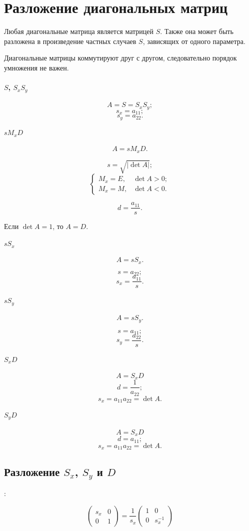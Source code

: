 \section{Разложение диагональных матриц}

Любая диагональные матрица является матрицей $S$. Также она может быть разложена в произведение частных случаев $S$, зависящих от одного параметра.

Диагональные матрицы коммутируют друг с другом, следовательно порядок умножения не важен.

\paragraph{$S$, $S_x S_y$}
$$A = S = S_x S_y;$$
$$s_x = a_{11};$$
$$s_y = a_{22}.$$

\paragraph{$s M_x D$}

$$A = s M_x D.$$

$$s = \sqrt{\left|\det A \right|};$$
$$\begin{cases}
	M_x = E, & \det A > 0;\\
	M_x = M, & \det A < 0.
\end{cases}$$

$$d = \frac{a_{11}}{s}.$$

Если $\det A = 1$, то $A = D$.

\paragraph{$s S_x$}

$$A = s S_x.$$

$$s = a_{22};$$
$$s_x = \frac{a_{11}}{s}.$$

\paragraph{$s S_y$}
$$A = s S_y.$$

$$s = a_{11};$$
$$s_y = \frac{a_{22}}{s}.$$

\paragraph{$S_x D$}

$$A = S_x D$$
$$d = \frac{1}{a_{22}};$$
$$s_x = a_{11} a_{22} = \det A.$$

\paragraph{$S_y D$}

$$A = S_x D$$
$$d = a_{11};$$
$$s_x = a_{11} a_{22} = \det A.$$

\subsection{Разложение $S_x$, $S_y$ и $D$}:

$$
\begin{pmatrix}
	s_x & 0 \\
	0 & 1
\end{pmatrix}
=
\frac{1}{s_x}
\begin{pmatrix}
	1 & 0 \\
	0 & s_x^{-1}
\end{pmatrix}
$$
